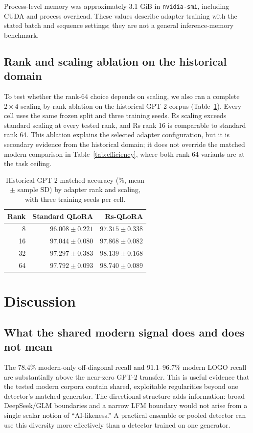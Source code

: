 \documentclass[utf8]{FrontiersinHarvard}
\begin{document}
Process-level memory was approximately 3.1 GiB in \texttt{nvidia-smi}, including CUDA and process overhead. These values describe adapter training with the stated batch and sequence settings; they are not a general inference-memory benchmark.

\subsection{Rank and scaling ablation on the historical domain}

To test whether the rank-64 choice depends on scaling, we also ran a complete $2\times4$ scaling-by-rank ablation on the historical GPT-2 corpus (Table~\ref{tab:rank}). Every cell uses the same frozen split and three training seeds. Rs scaling exceeds standard scaling at every tested rank, and Rs rank 16 is comparable to standard rank 64. This ablation explains the selected adapter configuration, but it is secondary evidence from the historical domain; it does not override the matched modern comparison in Table~\ref{tab:efficiency}, where both rank-64 variants are at the task ceiling.

\begin{table}[h!]
\centering
\caption{Historical GPT-2 matched accuracy (\%, mean $\pm$ sample SD) by adapter rank and scaling, with three training seeds per cell.}
\label{tab:rank}
\begin{tabular}{rrr}
\toprule
Rank & Standard QLoRA & Rs-QLoRA \\
\midrule
8 & $96.008 \pm 0.221$ & $97.315 \pm 0.338$ \\
16 & $97.044 \pm 0.080$ & $97.868 \pm 0.082$ \\
32 & $97.297 \pm 0.383$ & $98.139 \pm 0.168$ \\
64 & $97.792 \pm 0.093$ & $98.740 \pm 0.089$ \\
\bottomrule
\end{tabular}
\end{table}

\section{Discussion}

\subsection{What the shared modern signal does and does not mean}

The 78.4\% modern-only off-diagonal recall and 91.1--96.7\% modern LOGO recall are substantially above the near-zero GPT-2 transfer. This is useful evidence that the tested modern corpora contain shared, exploitable regularities beyond one detector's matched generator. The directional structure adds information: broad DeepSeek/GLM boundaries and a narrow LFM boundary would not arise from a single scalar notion of ``AI-likeness.'' A practical ensemble or pooled detector can use this diversity more effectively than a detector trained on one generator.
\end{document}
